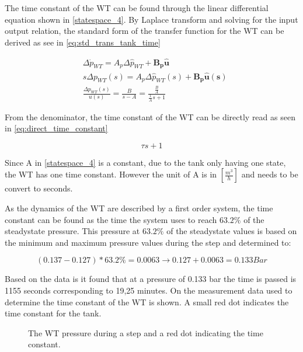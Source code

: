 The time constant of the WT can be found through the linear differential equation shown in \eqref{statespace_4}. By Laplace transform and solving for the input output relation, the standard form of the transfer function for the WT can be derived as see in \eqref{eq:std_trans_tank_time}

\begin{equation}
	\begin{split}
	&\Delta \dot{p}_{WT} = A_p \Delta \hat{p}_{WT}  + \pmb{B_p}\pmb{\hat{u}}\\
	&s\Delta p_{WT}(s) = A_p \Delta \hat{p}_{WT}(s)  + \pmb{B_p}\pmb{\hat{u}(s)}\\
	&\frac{\Delta p_{WT}(s)}{u(s)} = \frac{B}{s-A} = \frac{\frac{B}{A}}{\frac{1}{A}s + 1}
	\end{split}
	\label{eq:std_trans_tank_time}
\end{equation}

From the denominator, the time constant of the WT can be directly read as seen in \eqref{eq:direct_time_constant}

\begin{equation}
	\tau s + 1
	\label{eq:direct_time_constant}
\end{equation}

 Since A in \eqref{statespace_4} is a constant, due to the tank only having one state, the WT has one time constant. However the unit of A is in $[\frac{m^3}{h}]$ and needs to be convert to seconds. 

As the dynamics of the WT are described by a first order system, the time constant can be found as the time the system uses to reach $63.2\%$ of the steadystate pressure.
This pressure at $63.2\%$ of the steadystate values is based on the minimum and maximum pressure values during the step and determined to:

\begin{equation}
(0.137 - 0.127)*63.2 \% = 0.0063 \rightarrow 0.127 + 0.0063 = 0.133 Bar 
\end{equation}

Based on the data is it found that at a pressure of 0.133 bar the time is passed is 1155 seconds corresponding to 19,25 minutes. 
On  the measurement data used to determine the time constant of the WT is shown. A small red dot indicates the time constant for the tank.

\begin{figure}[H]

\caption{The WT pressure during a step and a red dot indicating the time constant.}
\label{fig:Test_WT_Timeconstant}
\end{figure}

